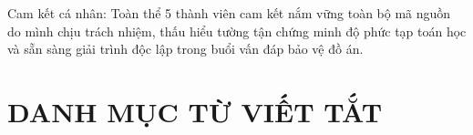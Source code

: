 \documentclass[14pt,a4paper]{extarticle}
\begin{document}
\vspace{0.25cm}
\noindent
Cam kết cá nhân: Toàn thể 5 thành viên cam kết nắm vững toàn bộ mã nguồn do mình chịu trách nhiệm, thấu hiểu tường tận chứng minh độ phức tạp toán học và sẵn sàng giải trình độc lập trong buổi vấn đáp bảo vệ đồ án.
\endgroup

\newpage
\thispagestyle{empty}
\tableofcontents

\newpage
\thispagestyle{empty}
\listoffigures

\newpage
\thispagestyle{empty}
\listoftables

\newpage
\thispagestyle{empty}
\section*{DANH MỤC TỪ VIẾT TẮT}
\end{document}
